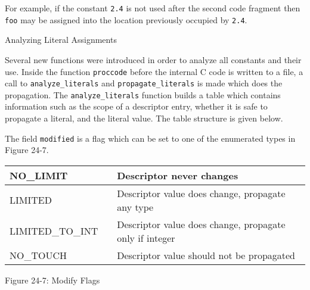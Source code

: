 For example, if the constant \texttt{2.4} is not used after the second
code fragment then \texttt{{\textquotedbl}foo{\textquotedbl}} may be
assigned into the location previously occupied by \texttt{2.4}.

{\sffamily
Analyzing Literal Assignments}


Several new functions were introduced in order to analyze all
constants and their use. Inside the function \texttt{proccode} before
the internal C code is written to a file, a call to
\texttt{analyze\_literals} and \texttt{propagate\_literals} is made
which does the propagation. The \texttt{analyze\_literals} function
builds a table which contains information such as the scope of a
descriptor entry, whether it is safe to propagate a literal, and the
literal value. The table structure is given below.


The field \texttt{modified} is a flag which can be set to one of the
enumerated types in Figure 24-7.

\begin{center}
\tabletail{}
\tablelasttail{}
\begin{supertabular}{|m{1.4302598in}|m{0.41155985in}|m{3.7115598in}|}
\hline
{\ttfamily NO\_LIMIT} &
 &
 Descriptor never changes\\\hline
{\ttfamily LIMITED} &
 &
 Descriptor value does change, propagate any type\\\hline
{\ttfamily LIMITED\_TO\_INT} &
 &
 Descriptor value does change, propagate only if integer\\\hline
{\ttfamily NO\_TOUCH} &
 &
 Descriptor value should not be propagated\\\hline
\end{supertabular}
\end{center}
{\centering{}
Figure 24-7: Modify Flags
\par}


